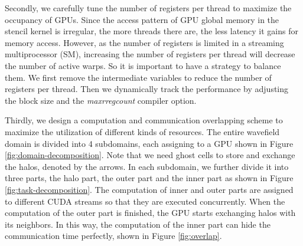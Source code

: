 \documentclass{paris17}
\begin{document}
Secondly, we carefully tune the number of registers per thread to maximize the occupancy of GPUs. Since the access pattern of GPU global memory in the stencil kernel is irregular, the more threads there are, the less latency it gains for memory access. However, as the number of registers is limited in a streaming multiprocessor (SM), increasing the number of registers per thread will decrease the number of active warps. So it is important to have a strategy to balance them. We first remove the intermediate variables to reduce the number of registers per thread. Then we dynamically track the performance by adjusting the block size and the \emph{maxrregcount} compiler option.

Thirdly, we design a computation and communication overlapping scheme to maximize the utilization of different kinds of resources. The entire wavefield domain is divided into 4 subdomains, each assigning to a GPU shown in Figure \ref{fig:domain-decomposition}. Note that we need ghost cells to store and exchange the halos, denoted by the arrows. In each subdomain, we further divide it into three parts, the halo part, the outer part and the inner part as shown in Figure \ref{fig:task-decomposition}. The computation of inner and outer parts are assigned to different CUDA streams so that they are executed concurrently. When the computation of the outer part is finished, the GPU starts exchanging halos with its neighbors. In this way, the computation of the inner part can hide the communication time perfectly, shown in Figure \ref{fig:overlap}.
\end{document}
